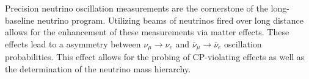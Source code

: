 \label{sec:IF_LBNProgram}
Precision neutrino oscillation measurements are the cornerstone of the long-baseline neutrino program. Utilizing beams of neutrinos fired over long distance allows for the enhancement of these measurements via matter effects. These effects lead to a asymmetry between $\nu_{\mu} \rightarrow \nu_{e}$ and $\bar{\nu}_{\mu} \rightarrow \bar{\nu}_{e}$ oscillation probabilities. This effect allows for the probing of CP-violating effects as well as the determination of the neutrino mass hierarchy. 